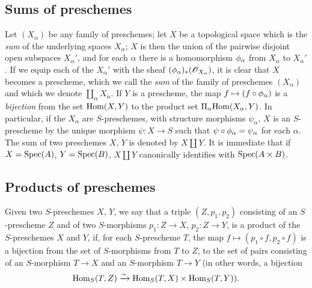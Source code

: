\subsection{Sums of preschemes}
\label{subsection-sums-of-preschemes}

Let $(X_\alpha)$ be any family of preschemes; let $X$ be a topological space which is the
{\it sum} of the underlying spaces $X_\alpha$; $X$ is then the union of the pairwise
disjoint open subspaces $X_\alpha'$, and for each $\alpha$ there is a homomorphism
$\phi_\alpha$ from $X_\alpha$ to $X_\alpha'$. If we equip each of the $X_\alpha'$ with the
sheaf $(\phi_\alpha)_*(\mathscr{O}_{X_\alpha})$, it is clear that $X$ becomes a prescheme, which
we call the {\it sum} of the family of preschemes $(X_\alpha)$ and which we denote
$\amalg_\alpha X_\alpha$. If $Y$ is a prescheme, the map $f\mapsto(f\circ\phi_\alpha)$ is a
{\it bijection} from the set ${\mathop{\mathrm{Hom}}\nolimits}(X,Y)$ to the product set $\Pi_\alpha{\mathop{\mathrm{Hom}}\nolimits}(X_\alpha,Y)$.
In particular, if the $X_\alpha$ are $S$-preschemes, with structure morphisms $\psi_\alpha$,
$X$ is an $S$-prescheme by the unique morphism $\psi:X\to S$ such that
$\psi\circ\phi_\alpha=\psi_\alpha$ for each $\alpha$. The sum of two preschemes $X$, $Y$ is
denoted by $X\amalg Y$. It is immediate that if $X={\mathop{\mathrm{Spec}}\nolimits}(A)$, $Y={\mathop{\mathrm{Spec}}\nolimits}(B)$, $X\amalg Y$
canonically identifies with ${\mathop{\mathrm{Spec}}\nolimits}(A\times B)$.

\subsection{Products of preschemes}
\label{subsection-products-of-preschemes}

\begin{defn}[3.2.1]
\label{defn-1.3.2.1}
Given two $S$-preschemes $X$, $Y$, we say that a triple $(Z,p_1,p_2)$ consisting of an
$S$-prescheme $Z$ and of two $S$-morphisms $p_1:Z\to X$, $p_2:Z\to Y$, is a product of the
$S$-preschemes $X$ and $Y$, if, for each $S$-prescheme $T$, the map
$f\mapsto(p_1\circ f,p_2\circ f)$ is a bijection from the set of $S$-morphisms from $T$ to
$Z$, to the set of pairs consisting of an $S$-morphism $T\to X$ and an $S$-morphism $T\to Y$
(in other words, a bijection
\[
  {\mathop{\mathrm{Hom}}\nolimits}_S(T,Z)\xrightarrow{\sim}{\mathop{\mathrm{Hom}}\nolimits}_S(T,X)\times{\mathop{\mathrm{Hom}}\nolimits}_S(T,Y)).
\]
\end{defn}

